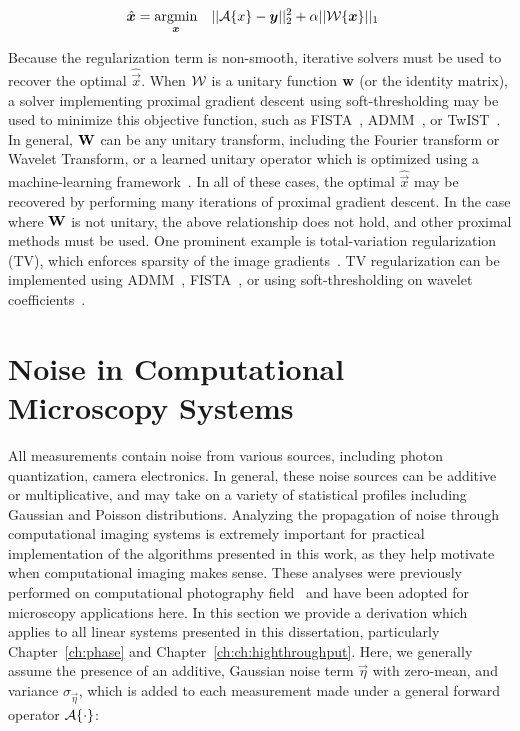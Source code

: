\begin{equation}\label{eq:intro_sparse}
\begin{aligned}
& \hat{\bm{x}} = \underset{\bm{x}}{\text{argmin}}
& & ||\mathcal{A}\{x\}-\bm{y} ||_2^2 + \alpha||\mathcal{W}\{\bm{x}\}||_1
\end{aligned}
\end{equation}

Because the regularization term is non-smooth, iterative solvers must be used to recover the optimal $\hat{\vec{x}}$. When $\mathcal{W}$ is a unitary function $\mathbf{w}$ (or the identity matrix), a solver implementing proximal gradient descent using soft-thresholding may be used to minimize this objective function, such as FISTA~\cite{beck2009fast}, ADMM~\cite{boyd2011distributed}, or TwIST~\cite{bioucas2007new}. In general, $\mathbf{W}$ can be any unitary transform, including the Fourier transform  or Wavelet Transform, or a learned unitary operator which is optimized using a machine-learning framework~\cite{ravishankar2013learning}. In all of these cases, the optimal $\hat{\vec{x}}$ may be recovered by performing many iterations of proximal gradient descent. In the case where $\mathbf{W}$ is not unitary, the above relationship does not hold, and other proximal methods must be used. One prominent example is total-variation regularization (TV), which enforces sparsity of the image gradients~\cite{rudin1992nonlinear}. TV regularization can be implemented using ADMM~\cite{wahlberg2012admm}, FISTA~\cite{beck2009fast}, or using soft-thresholding on wavelet coefficients~\cite{kamilov2012wavelet}.

\section{Noise in Computational Microscopy Systems}\label{sec:intro_noise}
All measurements contain noise from various sources, including photon quantization, camera electronics. In general, these noise sources can be additive or multiplicative, and may take on a variety of statistical profiles including Gaussian and Poisson distributions. Analyzing the propagation of noise through computational imaging systems is extremely important for practical implementation of the algorithms presented in this work, as they help motivate when computational imaging makes sense. These analyses were previously performed on computational photography field~\cite{cossairt2013does} and have been adopted for microscopy applications here. In this section we provide a derivation which applies to all linear systems presented in this dissertation, particularly Chapter~\ref{ch:phase} and Chapter~\ref{ch:ch:highthroughput}. Here, we generally assume the presence of an additive, Gaussian noise term $\vec{\eta}$ with zero-mean, and variance $\sigma_{\vec{\eta}}$, which is added to each measurement made under a general forward operator $\mathcal{A}\{\cdot\}$:

